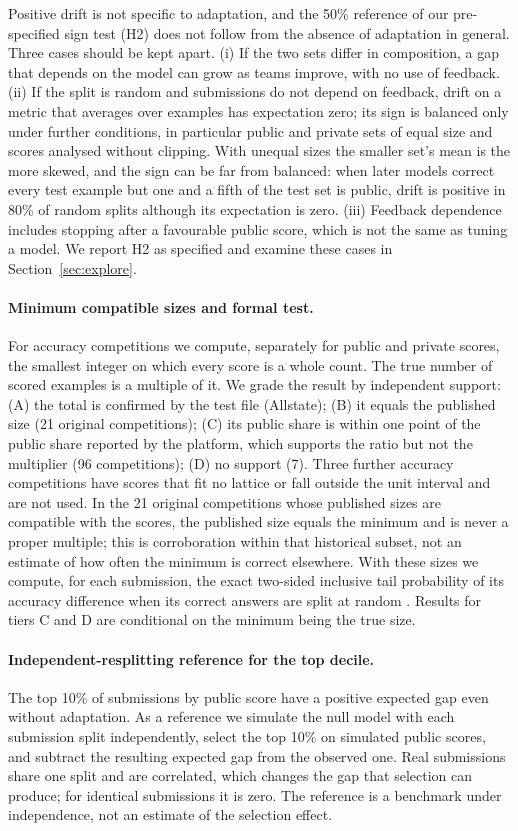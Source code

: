 \documentclass[10pt]{article}
\begin{document}
Positive drift is not specific to adaptation, and the 50\% reference of our pre-specified sign test (H2) does not follow from the absence of adaptation in general. Three cases should be kept apart. (i) If the two sets differ in composition, a gap that depends on the model can grow as teams improve, with no use of feedback. (ii) If the split is random and submissions do not depend on feedback, drift on a metric that averages over examples has expectation zero; its sign is balanced only under further conditions, in particular public and private sets of equal size and scores analysed without clipping. With unequal sizes the smaller set's mean is the more skewed, and the sign can be far from balanced: when later models correct every test example but one and a fifth of the test set is public, drift is positive in 80\% of random splits although its expectation is zero. (iii) Feedback dependence includes stopping after a favourable public score, which is not the same as tuning a model. We report H2 as specified and examine these cases in Section~\ref{sec:explore}.

\paragraph{Minimum compatible sizes and formal test.} For accuracy competitions we compute, separately for public and private scores, the smallest integer on which every score is a whole count. The true number of scored examples is a multiple of it. We grade the result by independent support: (A) the total is confirmed by the test file (Allstate); (B) it equals the published size (21 original competitions); (C) its public share is within one point of the public share reported by the platform, which supports the ratio but not the multiplier (96 competitions); (D) no support (7). Three further accuracy competitions have scores that fit no lattice or fall outside the unit interval and are not used. In the 21 original competitions whose published sizes are compatible with the scores, the published size equals the minimum and is never a proper multiple; this is corroboration within that historical subset, not an estimate of how often the minimum is correct elsewhere. With these sizes we compute, for each submission, the exact two-sided inclusive tail probability of its accuracy difference when its correct answers are split at random \citep{roelofs2019meta}. Results for tiers C and D are conditional on the minimum being the true size.

\paragraph{Independent-resplitting reference for the top decile.} The top 10\% of submissions by public score have a positive expected gap even without adaptation. As a reference we simulate the null model with each submission split independently, select the top 10\% on simulated public scores, and subtract the resulting expected gap from the observed one. Real submissions share one split and are correlated, which changes the gap that selection can produce; for identical submissions it is zero. The reference is a benchmark under independence, not an estimate of the selection effect.
\end{document}
